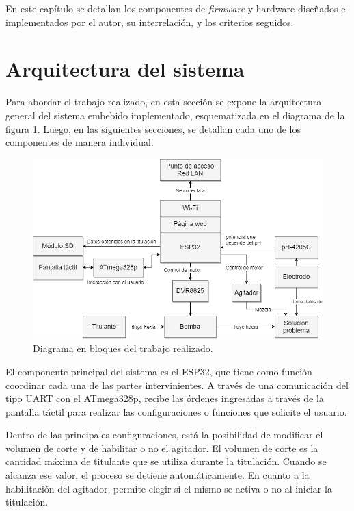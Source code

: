 En este capítulo se detallan los componentes de \textit{firmware} y hardware diseñados e implementados por el autor, su interrelación, y los criterios seguidos.

\section{Arquitectura del sistema}

Para abordar el trabajo realizado, en esta sección se expone la arquitectura general del sistema embebido implementado, esquematizada en el diagrama de la figura \ref{fig:diagramaCompleto}. Luego, en las siguientes secciones, se detallan cada uno de los componentes de manera individual.

\begin{figure}[htbp]
	\centering
	\includegraphics[width=1.0\textwidth]{./Figures/DiagramaBloquesCompleto.png}
	\caption{Diagrama en bloques del trabajo realizado.}
	\label{fig:diagramaCompleto}
\end{figure}

El componente principal del sistema es el ESP32, que tiene como función coordinar cada una de las partes intervinientes. A través de una comunicación del tipo UART con el ATmega328p, recibe las órdenes ingresadas a través de la pantalla táctil para realizar las configuraciones o funciones que solicite el usuario.

Dentro de las principales configuraciones, está la posibilidad de modificar el volumen de corte y de habilitar o no el agitador. El volumen de corte es la cantidad máxima de titulante que se utiliza durante la titulación. Cuando se alcanza ese valor, el proceso se detiene automáticamente. En cuanto a la habilitación del agitador, permite elegir si el mismo se activa o no al iniciar la titulación.

